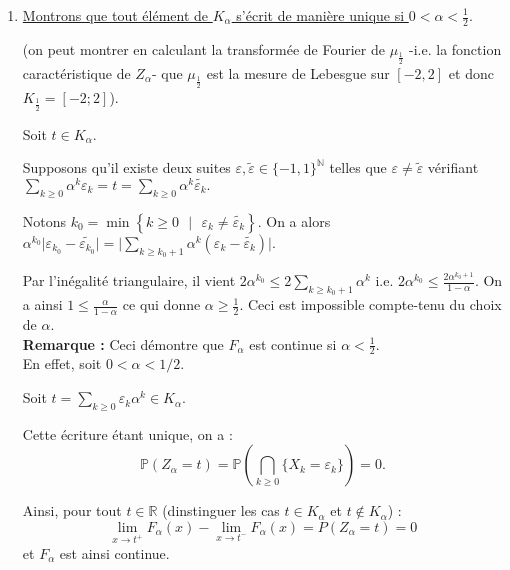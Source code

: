 \begin{enumerate}
\item \underline{Montrons que tout élément de $K_{\alpha}$ s'écrit de manière unique si $0<\alpha<\frac{1}{2}.$}
    
(on peut montrer en calculant la transformée de Fourier de $\mu_{\frac{1}{2}}$ -i.e. la fonction caractéristique de $Z_{\alpha}$- que $\mu_{\frac{1}{2}}$ est la mesure de Lebesgue sur $[-2,2]$ et donc $K_{\frac{1}{2}}=[-2;2]$).

Soit $t\in K_{\alpha}.$ 

Supposons qu'il existe deux suites $\varepsilon,\tilde{\varepsilon}\in\{-1,1\}^\mathbb{N}$ telles que $\varepsilon\neq \tilde{\varepsilon}$ vérifiant $\displaystyle \sum_{k\geq 0}\alpha^{k}\varepsilon_{k}=t=\sum_{k\geq 0}\alpha^{k}\tilde{\varepsilon_{k}}.$

Notons $k_{0}=\min\left\{ k\geq 0\mbox{ }|\mbox{ } \varepsilon_{k}\neq \tilde{\varepsilon_{k}} \right\}.$ On a alors $\displaystyle \alpha^{k_{0}}\vert \varepsilon_{k_{0}}-\tilde{\varepsilon_{k_{0}}}\vert =\big\vert \sum_{k\geq k_{0}+1}\alpha^{k}\left(\varepsilon_{k}-\tilde{\varepsilon_{k}}\right)\big\vert.$

Par l'inégalité triangulaire, il vient $\displaystyle 2\alpha^{k_{0}}\leq 2\sum_{k\geq k_{0}+1}\alpha^{k} \mbox{ i.e. } 2\alpha^{k_{0}}\leq \frac{2\alpha^{k_{0}+1}}{1-\alpha}.$
On a ainsi $\displaystyle 1\leq \frac{\alpha}{1-\alpha}$ ce qui donne $\alpha\geq \frac{1}{2}.$ Ceci est impossible compte-tenu du choix de $\alpha.$\\

\textbf{Remarque :} Ceci démontre que $F_{\alpha}$ est continue si $\alpha<\frac{1}{2}.$\\

En effet, soit $0<\alpha<1/2.$ 

Soit $t=\sum\limits_{k\geq 0}\varepsilon_{k}\alpha^{k}\in K_{\alpha}.$

Cette écriture étant unique, on a : $$\mathbb{P}(Z_{\alpha}=t)=\mathbb{P}\left( \bigcap_{k\geq 0}\{X_{k}=\varepsilon_{k}\} \right)=0.$$

Ainsi, pour tout $t\in\mathbb{R}$ (dinstinguer les cas $t\in K_{\alpha}$ et $t\notin K_{\alpha}$) : $$\lim_{x\rightarrow t^{+}}F_{\alpha}(x)-\lim_{x\rightarrow t^{-}}F_{\alpha}(x)=P(Z_{\alpha}=t)=0$$ et $F_{\alpha}$ est ainsi continue. 




\end{enumerate}
